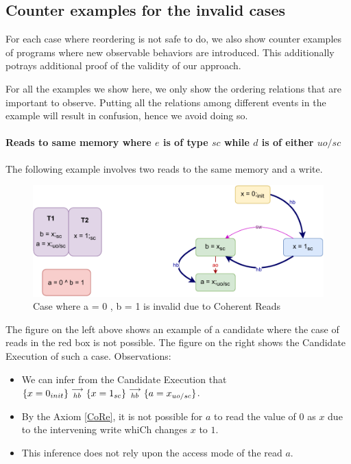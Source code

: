 
\subsection{Counter examples for the invalid cases}

    For each case where reordering is not safe to do, we also show counter examples of programs where new observable behaviors are introduced.
    This additionally potrays additional proof of the validity of our approach. 

    For all the examples we show here, we only show the ordering relations that are important to observe. 
    Putting all the relations among different events in the example will result in confusion, hence we avoid doing so. 

    \paragraph{Reads to same memory where $e$ is of type $sc$ while $d$ is of either $uo/sc$}
        
        The following example involves two reads to the same memory and a write. 
        
        \begin{figure}[H]
            \centering
            \includegraphics[scale=0.7]{InstructionReordering/Example1(Rsc-Ruo,sc).pdf}
            \caption{Case where a = 0 , b = 1 is invalid due to Coherent Reads}
        \end{figure}

        The figure on the left above shows an example of a candidate where the case of reads in the red box is not possible. 
        The figure on the right shows the Candidate Execution of such a case. 
        Observations:
        \begin{itemize}
            \item We can infer from the Candidate Execution that $\{x=0_{init}\}\stackrel{\longrightarrow}{_{hb}}\{x=1_{sc}\}\stackrel{\longrightarrow}{_{hb}}\{a=x_{uo/sc}\}$.
            \item By the Axiom \ref{CoRe}, it is not possible for $a$ to read the value of $0$ as $x$ due to the intervening write whiCh changes $x$ to $1$.  
            \item This inference does not rely upon the access mode of the read $a$. 
        \end{itemize}
        
